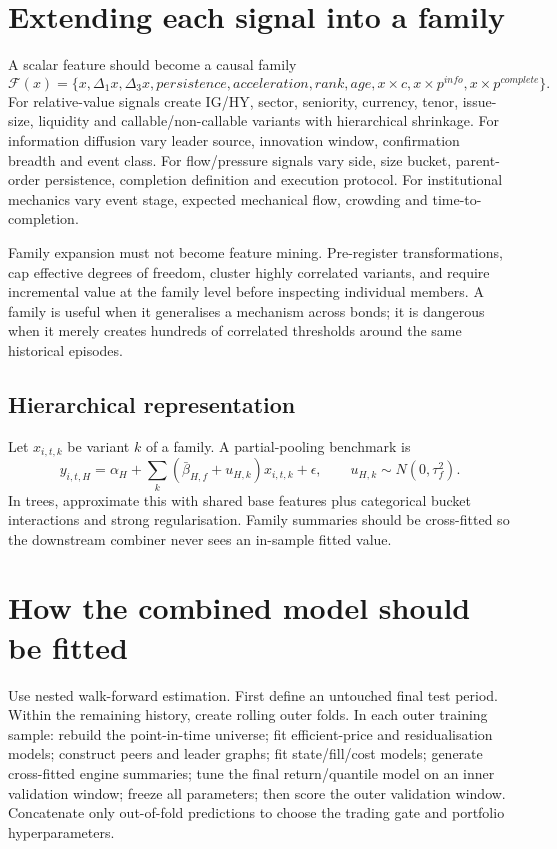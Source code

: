 \documentclass[10pt]{article}
\begin{document}
\section{Extending each signal into a family}
A scalar feature should become a causal family
\[\mathcal F(x)=\{x,\Delta_1x,\Delta_3x,persistence,acceleration,rank,age,x\times c,x\times p^{info},x\times p^{complete}\}.\]
For relative-value signals create IG/HY, sector, seniority, currency, tenor, issue-size, liquidity and callable/non-callable variants with hierarchical shrinkage. For information diffusion vary leader source, innovation window, confirmation breadth and event class. For flow/pressure signals vary side, size bucket, parent-order persistence, completion definition and execution protocol. For institutional mechanics vary event stage, expected mechanical flow, crowding and time-to-completion.

Family expansion must not become feature mining. Pre-register transformations, cap effective degrees of freedom, cluster highly correlated variants, and require incremental value at the family level before inspecting individual members. A family is useful when it generalises a mechanism across bonds; it is dangerous when it merely creates hundreds of correlated thresholds around the same historical episodes.

\subsection{Hierarchical representation}
Let $x_{i,t,k}$ be variant $k$ of a family. A partial-pooling benchmark is
\[y_{i,t,H}=\alpha_H+\sum_k(\bar\beta_{H,f}+u_{H,k})x_{i,t,k}+\epsilon,\qquad u_{H,k}\sim N(0,\tau_f^2).\]
In trees, approximate this with shared base features plus categorical bucket interactions and strong regularisation. Family summaries should be cross-fitted so the downstream combiner never sees an in-sample fitted value.
\newpage
\section{How the combined model should be fitted}
Use nested walk-forward estimation. First define an untouched final test period. Within the remaining history, create rolling outer folds. In each outer training sample: rebuild the point-in-time universe; fit efficient-price and residualisation models; construct peers and leader graphs; fit state/fill/cost models; generate cross-fitted engine summaries; tune the final return/quantile model on an inner validation window; freeze all parameters; then score the outer validation window. Concatenate only out-of-fold predictions to choose the trading gate and portfolio hyperparameters.
\end{document}
